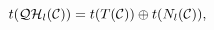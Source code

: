 \begin{equation}
t({\cal QH}_l({\cal  C}))=t(T({\cal C})) \oplus t(N_l({\cal C})),
\label{venxx}
\end{equation}

